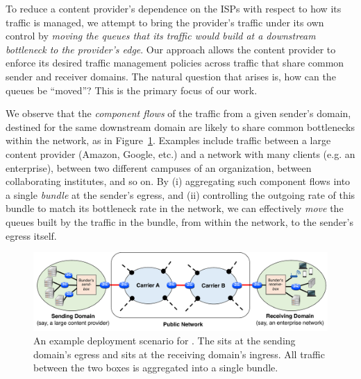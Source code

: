 To reduce a content provider's dependence on the ISPs with respect to how its traffic is managed, we attempt to bring the provider's traffic under its own control by \emph{moving the queues that its traffic would build at a downstream bottleneck to the provider's edge}. Our approach allows the content provider to enforce its desired traffic management policies across traffic that share common sender and receiver domains.
The natural question that arises is, how can the queues be ``moved''? This is the primary focus of our work. 

We observe that the \emph{component flows} of the traffic from a given sender's domain, destined for the same downstream domain are likely to share common bottlenecks within the network, as in Figure~\ref{fig:deploy:arch}. Examples include traffic between a large content provider (\eg Amazon, Google, etc.) and a network with many clients (e.g. an enterprise), between two different campuses of an organization, between collaborating institutes, and so on. By (i) aggregating such component flows into a single \emph{bundle} at the sender's egress, and (ii) controlling the outgoing rate of this bundle to match its bottleneck rate in the network, we can effectively \emph{move} the queues built by the traffic in the bundle, from within the network, to the sender's egress itself. 
\begin{figure}[t]
    \centering
    \includegraphics[width=\textwidth]{img/deployment-arch.pdf}
    \caption{An example deployment scenario for \name. 
    The \inbox sits at the sending domain's egress and \outbox sits at the receiving domain's ingress. All traffic between the two boxes is aggregated into a single bundle. 
    }\label{fig:deploy:arch}
\end{figure}

